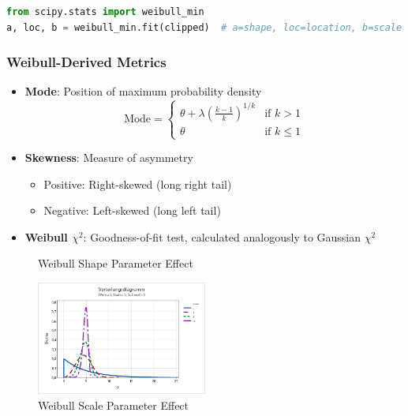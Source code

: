 \documentclass[12pt]{article}
\begin{document}
\begin{lstlisting}[language=Python]
from scipy.stats import weibull_min
a, loc, b = weibull_min.fit(clipped)  # a=shape, loc=location, b=scale
\end{lstlisting}

\subsubsection{Weibull-Derived Metrics}
\begin{itemize}
    \item \textbf{Mode}: Position of maximum probability density
    \begin{equation}
        \text{Mode} = 
        \begin{cases}
            \theta + \lambda\left(\frac{k-1}{k}\right)^{1/k} & \text{if } k > 1 \\
            \theta & \text{if } k \leq 1
        \end{cases}
    \end{equation}

    \item \textbf{Skewness}: Measure of asymmetry
    \begin{itemize}
        \item Positive: Right-skewed (long right tail)
        \item Negative: Left-skewed (long left tail)
    \end{itemize}

    \item \textbf{Weibull $\chi^2$}: Goodness-of-fit test, calculated analogously to Gaussian $\chi^2$
\end{itemize}

\begin{figure}[h]
    \centering
    \caption{Weibull Shape Parameter Effect}
    \label{fig:weibull_shape}
\end{figure}

\begin{figure}[h]
    \centering
    \includegraphics[width=0.5\textwidth]{weibull_scale.png}
    \caption{Weibull Scale Parameter Effect}
    \label{fig:weibull_scale}
\end{figure}
\end{document}
